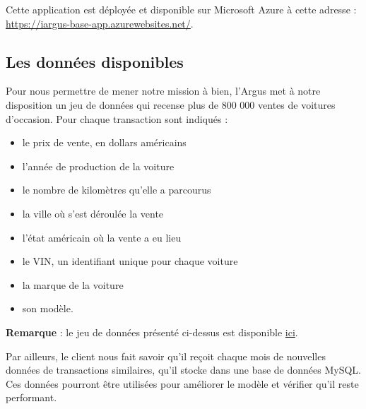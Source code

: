 \documentclass[french]{article}
\begin{document}
    Cette application est déployée et disponible sur Microsoft Azure à cette adresse : \href{https://iargus-base-app.azurewebsites.net/}{https://iargus-base-app.azurewebsites.net/}.

    \subsection{Les données disponibles}
    Pour nous permettre de mener notre mission à bien, l'Argus met à notre disposition un jeu de données qui recense plus de 800 000 ventes de voitures d'occasion. Pour chaque transaction sont indiqués :
    \begin{itemize}
        \item le prix de vente, en dollars américains
        \item l'année de production de la voiture
        \item le nombre de kilomètres qu'elle a parcourus
        \item la ville où s'est déroulée la vente
        \item l'état américain où la vente a eu lieu
        \item le VIN, un identifiant unique pour chaque voiture
        \item la marque de la voiture
        \item son modèle.
    \end{itemize}
    \textbf{Remarque} : le jeu de données présenté ci-dessus est disponible \href{https://www.kaggle.com/datasets/harikrishnareddyb/used-car-price-predictions/data}{ici}.
    
    Par ailleurs, le client nous fait savoir qu'il reçoit chaque mois de nouvelles données de transactions similaires, qu'il stocke dans une base de données MySQL. Ces données pourront être utilisées pour améliorer le modèle et vérifier qu'il reste performant.
\end{document}
